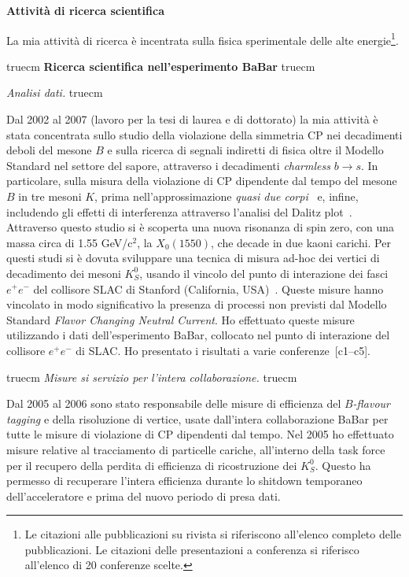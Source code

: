 \documentclass[11pt,twoside,a4paper]{article}
\begin{document}
\begin{center}
{\bf{Attivit\`a di ricerca scientifica}}
\end{center}

La mia attivit\`a di ricerca \`e incentrata sulla fisica sperimentale
delle alte energie\footnote{Le citazioni alle pubblicazioni su rivista
si riferiscono all'elenco completo delle pubblicazioni. Le citazioni
delle presentazioni a conferenza si riferisco all'elenco di 20
conferenze scelte.}.


 truecm
{\bf{Ricerca scientifica nell'esperimento BaBar}}
 truecm

\textit{Analisi dati.}
 truecm

Dal 2002 al 2007 (lavoro per la tesi di laurea e di dottorato) la mia
attivit\`a \`e stata concentrata sullo studio della violazione della
simmetria CP nei decadimenti deboli del mesone $B$ e sulla ricerca di
segnali indiretti di fisica oltre il Modello Standard nel settore del
sapore, attraverso i decadimenti \textit{charmless} $b \to s$. In
particolare, sulla misura della violazione di CP dipendente dal tempo
del mesone $B$ in tre mesoni $K$, prima nell'approssimazione
\textit{quasi due corpi}~\cite{Aubert:2008rr} e, infine, includendo
gli effetti di interferenza attraverso l'analisi del Dalitz
plot~\cite{Aubert:2007sd,Aubert:2007me}. Attraverso questo studio si
\`e scoperta una nuova risonanza di spin zero, con una massa circa di
1.55 GeV/c$^2$, la $X_0(1550)$, che decade in due kaoni carichi. Per
questi studi si \`e dovuta sviluppare una tecnica di misura ad-hoc dei
vertici di decadimento dei mesoni $K^0_S$, usando il vincolo del punto
di interazione dei fasci $e^+e^-$ del collisore SLAC di Stanford
(California, USA)~\cite{Aubert:2005dy,Aubert:2005gj}.  Queste misure
hanno vincolato in modo significativo la presenza di processi non
previsti dal Modello Standard \textit{Flavor Changing Neutral
  Current}.  Ho effettuato queste misure utilizzando i dati
dell'esperimento BaBar, collocato nel punto di interazione del
collisore $e^+e^-$ di SLAC. Ho presentato i risultati a varie
conferenze~[c1--c5].

 truecm
\textit{Misure si servizio per l'intera collaborazione.}
 truecm

Dal 2005 al 2006 sono stato responsabile delle misure di efficienza
del \textit{$B$-flavour tagging} e della risoluzione di vertice, usate
dall'intera collaborazione BaBar per tutte le misure di violazione di
CP dipendenti dal tempo. Nel 2005 ho effettuato misure relative al
tracciamento di particelle cariche, all'interno della task force per
il recupero della perdita di efficienza di ricostruzione dei
$K^0_S$. Questo ha permesso di recuperare l'intera efficienza durante
lo shitdown temporaneo dell'acceleratore e prima del nuovo periodo di
presa dati.
\end{document}
